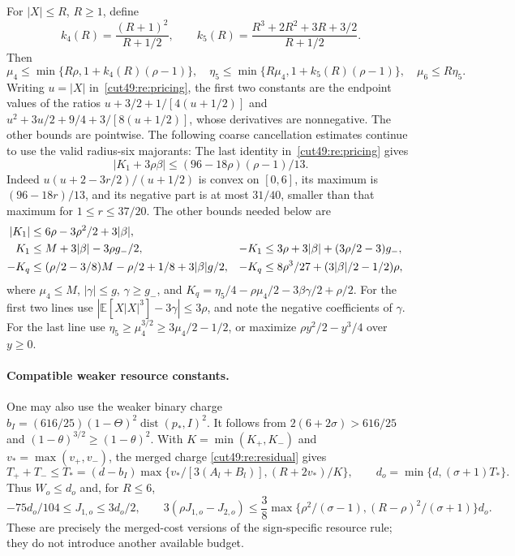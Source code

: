 \documentclass[11pt,a4paper]{article}
\numberwithin{equation}{section}
\theoremstyle{definition}
\theoremstyle{remark}
\newcommand{\E}{\mathbb E}
\begin{document}
For $|X|\le R$, $R\ge1$, define
\[
 k_4(R)=\frac{(R+1)^2}{R+1/2},\qquad
 k_5(R)=\frac{R^3+2R^2+3R+3/2}{R+1/2}.
\]
Then
\begin{equation}\label{cut49:mom:universal-moments}
 \mu_4\le\min\{R\rho,1+k_4(R)(\rho-1)\},\quad
 \eta_5\le\min\{R\mu_4,1+k_5(R)(\rho-1)\},\quad
 \mu_6\le R\eta_5.
\end{equation}
Writing $u=|X|$ in~\eqref{cut49:re:pricing}, the first two constants
are the endpoint values of the ratios
$u+3/2+1/[4(u+1/2)]$ and
$u^2+3u/2+9/4+3/[8(u+1/2)]$, whose derivatives are nonnegative.
The other bounds are pointwise. The following coarse cancellation estimates
continue to use the valid radius-six majorants:
The last identity in~\eqref{cut49:re:pricing} gives
\begin{equation}\label{cut49:mom:K-cancellation}
 |K_1+3\rho\beta|\le(96-18\rho)(\rho-1)/13.
\end{equation}
Indeed $u(u+2-3r/2)/(u+1/2)$ is convex on $[0,6]$, its maximum is
$(96-18r)/13$, and its negative part is at most $31/40$, smaller than that
maximum for $1\le r\le37/20$.
The other bounds needed below are
\begin{align}
 |K_1|&\le6\rho-3\rho^2/2+3|\beta|,\notag\\
 K_1&\le M+3|\beta|-3\rho g_-/2,&
 -K_1&\le3\rho+3|\beta|+(3\rho/2-3)g_-,\notag\\
 -K_q&\le(\rho/2-3/8)M-\rho/2+1/8+3|\beta|g/2,&
 -K_q&\le8\rho^3/27+(3|\beta|/2-1/2)\rho,               \label{cut49:mom:K-bounds}
\end{align}
where $\mu_4\le M$, $|\gamma|\le g$, $\gamma\ge g_-$, and
$K_q=\eta_5/4-\rho\mu_4/2-3\beta\gamma/2+\rho/2$.
For the first two lines use
$|\E[X|X|^3]-3\gamma|\le3\rho$, and note the negative coefficients
of $\gamma$. For the last line use
$\eta_5\ge\mu_4^{3/2}\ge3\mu_4/2-1/2$, or maximize
$\rho y^2/2-y^3/4$ over $y\ge0$.

\paragraph{Compatible weaker resource constants.}
One may also use the weaker binary charge
$b_I=(616/25)(1-\Theta)^2\operatorname{dist}(p_*,I)^2$.
It follows from $2(6+2\sigma)>616/25$ and
$(1-\theta)^{3/2}\ge(1-\theta)^2$.
With $K=\min(K_+,K_-)$ and $v_* =\max(v_+,v_-)$, the merged charge
\eqref{cut49:re:residual} gives
\[
 T_++T_-\le T_*=(d-b_I)\max\{v_*/[3(A_l+B_l)],(R+2v_*)/K\},
 \qquad d_o=\min\{d,(\sigma+1)T_*\}.
\]
Thus $W_o\le d_o$ and, for $R\le6$,
\[
 -75d_o/104\le J_{1,o}\le3d_o/2,\qquad
 3(\rho J_{1,o}-J_{2,o})\le\frac38
 \max\{\rho^2/(\sigma-1),(R-\rho)^2/(\sigma+1)\}d_o.
\]
These are precisely the merged-cost versions of the sign-specific
resource rule; they do not introduce another available budget.
\end{document}
